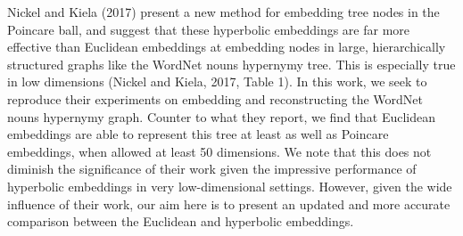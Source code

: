 Nickel and Kiela (2017) present a new method for embedding tree nodes in the Poincare ball, and suggest that these hyperbolic embeddings are far more effective than Euclidean embeddings at embedding nodes in large, hierarchically structured graphs like the WordNet nouns hypernymy tree. This is especially true in low dimensions (Nickel and Kiela, 2017, Table 1). In this work, we seek to reproduce their experiments on embedding and reconstructing the WordNet nouns hypernymy graph. Counter to what they report, we find that Euclidean embeddings are able to represent this tree at least as well as Poincare embeddings, when allowed at least 50 dimensions. We note that this does not diminish the significance of their work given the impressive performance of hyperbolic embeddings in very low-dimensional settings. However, given the wide influence of their work, our aim here is to present an updated and more accurate comparison between the Euclidean and hyperbolic embeddings.
